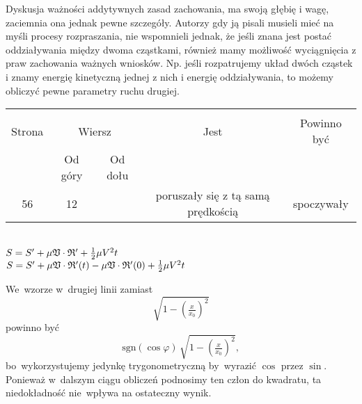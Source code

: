 \documentclass[a4paper,11pt]{article}
\begin{document}
\vspace{\spaceFour}


\start {} Dyskusja ważności addytywnych zasad zachowania, ma
swoją głębię i wagę, zaciemnia ona jednak pewne szczegóły. Autorzy gdy
ją pisali musieli mieć na myśli procesy rozpraszania, nie wspomnieli
jednak, że jeśli znana jest postać oddziaływania między dwoma
cząstkami, również mamy możliwość wyciągnięcia z praw zachowania
ważnych wniosków. Np. jeśli rozpatrujemy układ dwóch cząstek i znamy
energię kinetyczną jednej z nich i energię oddziaływania, to możemy
obliczyć pewne parametry ruchu drugiej.


\begin{center}
  \begin{tabular}{|c|c|c|c|c|}
    \hline
    & \multicolumn{2}{c|}{} & & \\
    Strona & \multicolumn{2}{c|}{Wiersz} & Jest
                              & Powinno być \\ \cline{2-3}
    & Od góry & Od dołu & & \\
    \hline
    56  & 12 & & poruszały się z tą samą prędkością & spoczywały \\
    \hline
  \end{tabular}
\end{center}
\noi
{} \\
\Jest $S = S' + \mu \mathfrak{V} \cdot \mathfrak{R}' + \frac{ 1 }{ 2 } \mu V^{ 2 } t$ \\
\Powin $S = S' + \mu \mathfrak{V} \cdot \mathfrak{R}'( t ) - \mu \mathfrak{V} \cdot
\mathfrak{R}'( 0 ) + \frac{ 1 }{ 2 } \mu V^{ 2 } t$ \\

\vspace{\spaceTwo}








\start {} We~wzorze w~drugiej linii zamiast
\begin{equation}
  \sqrt{1 - \left( \tfrac{ x }{ x_{ 0 } } \right)^{ 2 } }
\end{equation}
powinno być
\begin{equation}
  \mathrm{sgn}( \cos \varphi ) \, \sqrt{1 - \left( \tfrac{ x }{ x_{ 0 } }
    \right)^{ 2 } },
\end{equation}
bo~wykorzystujemy jedynkę trygonometryczną by~wyrazić $\cos$ przez
$\sin$. Ponieważ w~dalszym ciągu obliczeń podnosimy ten człon do
kwadratu, ta niedokładność nie~wpływa na ostateczny wynik.
\end{document}
